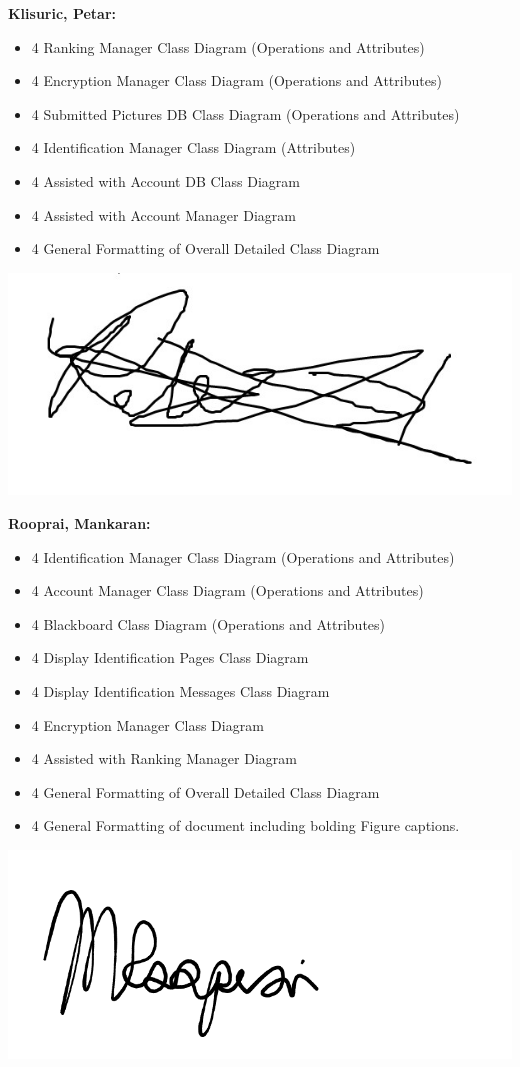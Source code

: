 \documentclass[]{article}
\begin{document}
\textbf{Klisuric, Petar:}
\begin{itemize}
    \item 4 Ranking Manager Class Diagram (Operations and Attributes)
    \item 4 Encryption Manager Class Diagram (Operations and Attributes)
    \item 4 Submitted Pictures DB Class Diagram (Operations and Attributes)
    \item 4 Identification Manager Class Diagram (Attributes)
    \item 4 Assisted with Account DB Class Diagram
    \item 4 Assisted with Account Manager Diagram
    \item 4 General Formatting of Overall Detailed Class Diagram
\end{itemize}
\includegraphics[scale=0.15]{petarsignature.jpg}

\textbf{Rooprai, Mankaran:}
\begin{itemize}
    \item 4 Identification Manager Class Diagram (Operations and Attributes)
    \item 4 Account Manager Class Diagram (Operations and Attributes)
    \item 4 Blackboard Class Diagram (Operations and Attributes)
    \item 4 Display Identification Pages Class Diagram
    \item 4 Display Identification Messages Class Diagram
    \item 4 Encryption Manager Class Diagram
    \item 4 Assisted with Ranking Manager Diagram
    \item 4 General Formatting of Overall Detailed Class Diagram
    \item 4 General Formatting of document including bolding Figure captions.
\end{itemize}
\includegraphics[scale=0.15]{mankaransignature.png}
\end{document}
